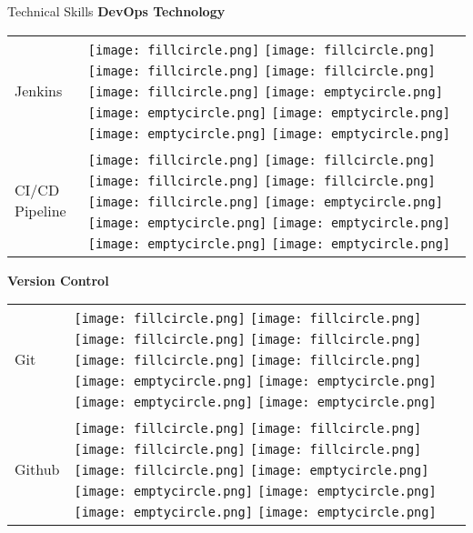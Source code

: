 \documentclass{resume}
\begin{document}
\begin{rSection}{Technical Skills}
{\bf DevOps Technology }
\begin{table}[h!]
  \begin{tabular}{p{10cm}p{6cm}}
  Jenkins & 
  \texttt{[image: fillcircle.png]} 
  \texttt{[image: fillcircle.png]} 
  \texttt{[image: fillcircle.png]}
  \texttt{[image: fillcircle.png]} 
  \texttt{[image: fillcircle.png]}
  \texttt{[image: emptycircle.png]} 
  \texttt{[image: emptycircle.png]}
  \texttt{[image: emptycircle.png]} 
  \texttt{[image: emptycircle.png]} 
  \texttt{[image: emptycircle.png]} \\  
  CI/CD Pipeline & 
  \texttt{[image: fillcircle.png]} 
  \texttt{[image: fillcircle.png]} 
  \texttt{[image: fillcircle.png]}
  \texttt{[image: fillcircle.png]} 
  \texttt{[image: fillcircle.png]}
  \texttt{[image: emptycircle.png]} 
  \texttt{[image: emptycircle.png]}
  \texttt{[image: emptycircle.png]} 
  \texttt{[image: emptycircle.png]} 
  \texttt{[image: emptycircle.png]} \\
  \end{tabular}
\end{table}

{\bf Version Control }
\begin{table}[h!]
  \begin{tabular}{p{10cm}p{6cm}}
	Git & 
  \texttt{[image: fillcircle.png]} 
  \texttt{[image: fillcircle.png]} 
  \texttt{[image: fillcircle.png]}
  \texttt{[image: fillcircle.png]} 
  \texttt{[image: fillcircle.png]}
  \texttt{[image: fillcircle.png]} 
  \texttt{[image: emptycircle.png]}
  \texttt{[image: emptycircle.png]} 
  \texttt{[image: emptycircle.png]} 
  \texttt{[image: emptycircle.png]} \\
	Github & 
  \texttt{[image: fillcircle.png]} 
  \texttt{[image: fillcircle.png]} 
  \texttt{[image: fillcircle.png]}
  \texttt{[image: fillcircle.png]} 
  \texttt{[image: fillcircle.png]}
  \texttt{[image: emptycircle.png]} 
  \texttt{[image: emptycircle.png]}
  \texttt{[image: emptycircle.png]} 
  \texttt{[image: emptycircle.png]} 
  \texttt{[image: emptycircle.png]} \\
  \end{tabular}
\end{table}


\end{rSection}
\end{document}
